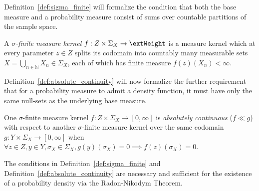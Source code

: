 Definition~\ref{def:sigma_finite} will formalize the condition that both the base measure and a probability measure consist of sums over countable partitions of the sample space.
\begin{definition}
\label{def:sigma_finite}
A \emph{$\sigma$-finite measure kernel} $f: Z \times \Sigma_X \rightarrow \extWeight$ is a measure kernel which at every parameter $z \in Z$ splits its codomain into countably many measurable sets $X = \bigcup_{n \in \mathbb{N}} X_n \in \Sigma_X$, each of which has finite measure $f(z)(X_n) < \infty$.
\end{definition}
Definition~\ref{def:absolute_continuity} will now formalize the further requirement that for a probability measure to admit a density function, it must have only the same null-sets as the underlying base measure.
\begin{definition}
\label{def:absolute_continuity}
One $\sigma$-finite measure kernel $f: Z \times \Sigma_X \rightarrow [0, \infty]$ is \emph{absolutely continuous} ($f \ll g$) with respect to another $\sigma$-finite measure kernel over the same codomain $g: Y \times \Sigma_X \rightarrow [0, \infty]$ when $\forall z\in Z, y\in Y, \sigma_X \in \Sigma_X, g(y)(\sigma_X) = 0 \implies f(z)(\sigma_X) = 0$.
\end{definition}
The conditions in Definition~\ref{def:sigma_finite} and Definition~\ref{def:absolute_continuity} are necessary and sufficient for the existence of a probability density via the Radon-Nikodym Theorem.
